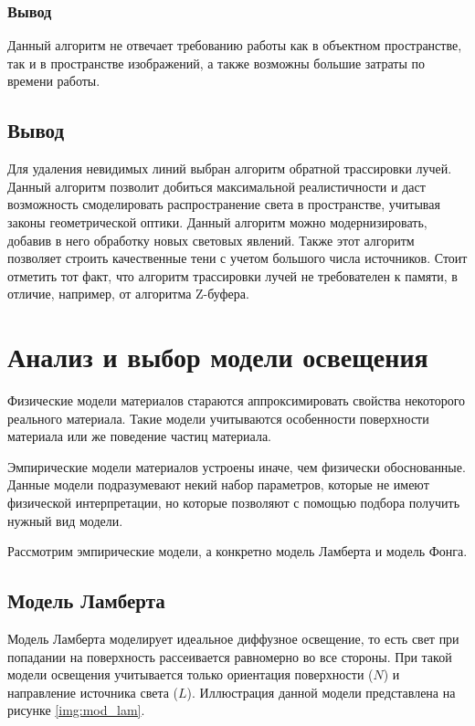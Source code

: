 \subsubsection*{Вывод}
 Данный алгоритм не отвечает требованию работы как в объектном пространстве, так и в пространстве изображений, а также возможны большие затраты по времени работы.
 
 
\subsection{Вывод}
Для удаления невидимых линий выбран алгоритм обратной трассировки лучей. Данный алгоритм позволит добиться максимальной реалистичности и даст возможность смоделировать распространение света в пространстве, учитывая законы геометрической оптики. Данный алгоритм можно модернизировать, добавив в него обработку новых световых явлений. Также этот алгоритм позволяет строить качественные тени с учетом большого числа источников. Стоит отметить тот факт, что алгоритм трассировки лучей не требователен к памяти, в отличие, например, от алгоритма Z-буфера.


\section{Анализ и выбор модели освещения}

Физические модели материалов стараются аппроксимировать свойства некоторого реального материала. Такие модели учитываются особенности поверхности материала или же поведение частиц материала.

Эмпирические модели материалов устроены иначе, чем физически обоснованные. Данные модели подразумевают некий набор параметров, которые не имеют физической интерпретации, но которые позволяют с помощью подбора получить нужный вид модели.

Рассмотрим эмпирические модели, а конкретно модель Ламберта и модель Фонга.

\subsection*{Модель Ламберта}

Модель Ламберта моделирует идеальное диффузное освещение, то есть свет при попадании на поверхность рассеивается равномерно во все стороны. При такой модели освещения учитывается только ориентация поверхности ($N$) и направление источника света ($L$). Иллюстрация данной модели представлена на рисунке \ref{img:mod_lam}.
\clearpage
{}

